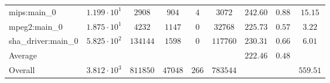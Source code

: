 \begin{tabular}{|l|c|c|c|c|c|c|c|c|}
mips:main\_0            & $ 1.199 \cdot 10^{1}  $ & $ 2908   $ & $ 904   $ & $ 4   $ & $ 3072   $ & $ 242.60      $ & $ 0.88    $ & $ 15.15   $ \\
mpeg2:main\_0           & $ 1.875 \cdot 10^{1}  $ & $ 4232   $ & $ 1147  $ & $ 0   $ & $ 32768  $ & $ 225.73      $ & $ 0.57    $ & $ 3.22    $ \\
sha\_driver:main\_0     & $ 5.825 \cdot 10^{2}  $ & $ 134144 $ & $ 1598  $ & $ 0   $ & $ 117760 $ & $ 230.31      $ & $ 0.66    $ & $ 6.01    $ \\
\hline
Average                 & $                     $ & $        $ & $       $ & $     $ & $        $ & $ 222.46      $ & $ 0.48    $ & $         $ \\
\hline
Overall                 & $ 3.812 \cdot 10^{3}  $ & $ 811850 $ & $ 47048 $ & $ 266 $ & $ 783544 $ & $             $ & $         $ & $ 559.51  $ \\
\hline
\end{tabular}
